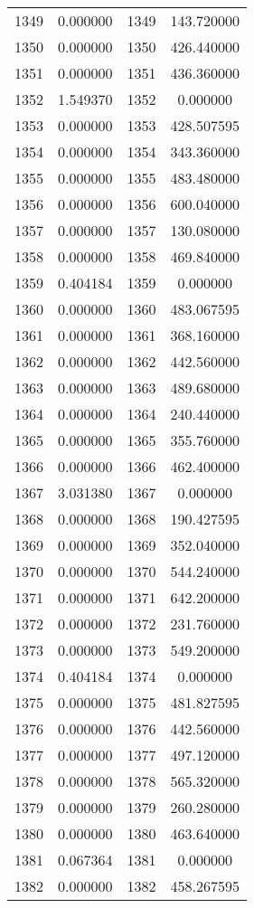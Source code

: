 \documentclass[12pt]{article}
\begin{document}
\begin{longtable}{@{}cccc@{}}
1349 & 0.000000 & 1349 & 143.720000 \\
1350 & 0.000000 & 1350 & 426.440000 \\
1351 & 0.000000 & 1351 & 436.360000 \\
1352 & 1.549370 & 1352 & 0.000000 \\
1353 & 0.000000 & 1353 & 428.507595 \\
1354 & 0.000000 & 1354 & 343.360000 \\
1355 & 0.000000 & 1355 & 483.480000 \\
1356 & 0.000000 & 1356 & 600.040000 \\
1357 & 0.000000 & 1357 & 130.080000 \\
1358 & 0.000000 & 1358 & 469.840000 \\
1359 & 0.404184 & 1359 & 0.000000 \\
1360 & 0.000000 & 1360 & 483.067595 \\
1361 & 0.000000 & 1361 & 368.160000 \\
1362 & 0.000000 & 1362 & 442.560000 \\
1363 & 0.000000 & 1363 & 489.680000 \\
1364 & 0.000000 & 1364 & 240.440000 \\
1365 & 0.000000 & 1365 & 355.760000 \\
1366 & 0.000000 & 1366 & 462.400000 \\
1367 & 3.031380 & 1367 & 0.000000 \\
1368 & 0.000000 & 1368 & 190.427595 \\
1369 & 0.000000 & 1369 & 352.040000 \\
1370 & 0.000000 & 1370 & 544.240000 \\
1371 & 0.000000 & 1371 & 642.200000 \\
1372 & 0.000000 & 1372 & 231.760000 \\
1373 & 0.000000 & 1373 & 549.200000 \\
1374 & 0.404184 & 1374 & 0.000000 \\
1375 & 0.000000 & 1375 & 481.827595 \\
1376 & 0.000000 & 1376 & 442.560000 \\
1377 & 0.000000 & 1377 & 497.120000 \\
1378 & 0.000000 & 1378 & 565.320000 \\
1379 & 0.000000 & 1379 & 260.280000 \\
1380 & 0.000000 & 1380 & 463.640000 \\
1381 & 0.067364 & 1381 & 0.000000 \\
1382 & 0.000000 & 1382 & 458.267595 \\

\end{longtable}
\end{document}
